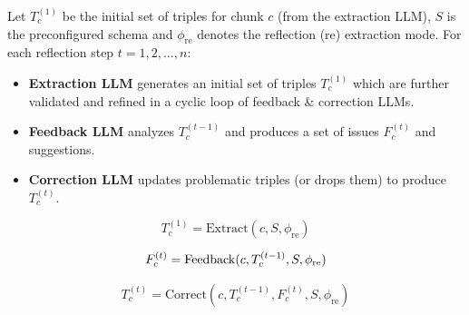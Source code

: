 
Let $T_c^{(1)}$ be the initial set of triples for chunk $c$ (from the extraction LLM), $S$ is the preconfigured schema and $\phi_{\mathrm{re}}$ denotes the reflection (re) extraction mode. For each reflection step $t = 1, 2, \ldots, n$:
\begin{itemize}
\item \textbf{Extraction LLM} generates an initial set of triples $T_c^{(1)}$ which are further validated and refined in a cyclic loop of feedback \& correction LLMs.
\item \textbf{Feedback LLM} analyzes $T_c^{(t-1)}$ and produces a set of issues $F_c^{(t)}$ and suggestions.
\item \textbf{Correction LLM} updates problematic triples (or drops them) to produce $T_c^{(t)}$.
\end{itemize}
\begin{equation}
T_c^{(1)} = \mathrm{Extract}(c, S, \phi_{\mathrm{re}})
\label{eq:reflection_prompting_1}
\end{equation}

\begin{equation}
F_c^{(t)} = \mathrm{Feedback}(c, T_c^{(t-1)}, S, \phi_{\mathrm{re}}) \\
\label{eq:reflection_prompting_2}
\end{equation}

\begin{equation}
T_c^{(t)} = \mathrm{Correct}(c, T_c^{(t-1)}, F_c^{(t)}, S, \phi_{\mathrm{re}})
\label{eq:reflection_prompting_3}
\end{equation}

